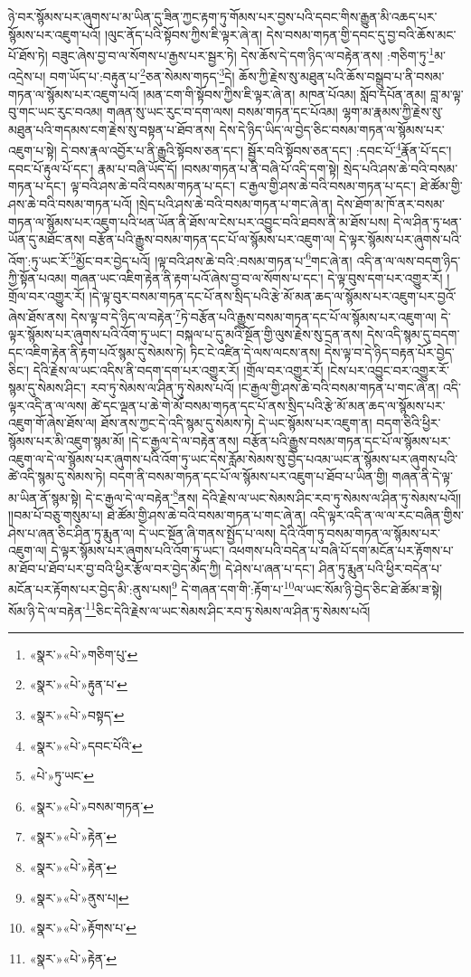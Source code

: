ཉེ་བར་སྙོམས་པར་ཞུགས་པ་མ་ཡིན་དུ་ཟིན་ཀྱང་རྟག་ཏུ་གོམས་པར་བྱས་པའི་དབང་གིས་རྒྱུན་མི་འཆད་པར་སྙོམས་པར་འཇུག་པའོ། །ལུང་ནོད་པའི་སྟོབས་ཀྱིས་ཇི་ལྟར་ཞེ་ན། དེས་བསམ་གཏན་གྱི་དབང་དུ་བྱ་བའི་ཆོས་མང་པོ་ཐོས་ཏེ། བཟུང་ཞེས་བྱ་བ་ལ་སོགས་པ་རྒྱས་པར་སྦྱར་ཏེ། དེས་ཆོས་དེ་དག་ཉིད་ལ་བརྟེན་ནས། :གཅིག་ཏུ་\footnote{«སྣར་»«པེ་»གཅིག་པུ་}མ་འདྲེས་པ། བག་ཡོད་པ་:བརྟུན་པ་\footnote{«སྣར་»«པེ་»རྟུན་པ་}ཅན་སེམས་གཏད་\footnote{«སྣར་»«པེ་»བསྟད་}དེ། ཆོས་ཀྱི་རྗེས་སུ་མཐུན་པའི་ཆོས་བསྒྲུབ་པ་ནི་བསམ་གཏན་ལ་སྙོམས་པར་འཇུག་པའོ། །མན་ངག་གི་སྟོབས་ཀྱིས་ཇི་ལྟར་ཞེ་ན། མཁན་པོའམ། སློབ་དཔོན་ནམ། བླ་མ་ལྟ་བུ་གང་ཡང་རུང་བའམ། གཞན་སུ་ཡང་རུང་བ་དག་ལས། བསམ་གཏན་དང་པོའམ། ལྷག་མ་རྣམས་ཀྱི་རྗེས་སུ་མཐུན་པའི་གདམས་ངག་རྗེས་སུ་བསྟན་པ་ཐོབ་ནས། དེས་དེ་ཉིད་ཡིད་ལ་བྱེད་ཅིང་བསམ་གཏན་ལ་སྙོམས་པར་འཇུག་པ་སྟེ། དེ་བས་རྣལ་འབྱོར་པ་ནི་རྒྱུའི་སྟོབས་ཅན་དང་། སྦྱོར་བའི་སྟོབས་ཅན་དང་། :དབང་པོ་\footnote{«སྣར་»«པེ་»དབང་པོའི་}རྣོན་པོ་དང་། དབང་པོ་རྟུལ་པོ་དང་། རྣམ་པ་བཞི་ཡོད་དོ། །བསམ་གཏན་པ་ནི་བཞི་པོ་འདི་དག་སྟེ། སྲེད་པའི་ཤས་ཆེ་བའི་བསམ་གཏན་པ་དང་། ལྟ་བའི་ཤས་ཆེ་བའི་བསམ་གཏན་པ་དང་། ང་རྒྱལ་གྱི་ཤས་ཆེ་བའི་བསམ་གཏན་པ་དང་། ཐེ་ཚོམ་གྱི་ཤས་ཆེ་བའི་བསམ་གཏན་པའོ། །སྲེད་པའི་ཤས་ཆེ་བའི་བསམ་གཏན་པ་གང་ཞེ་ན། དེས་ཐོག་མ་ཁོ་ནར་བསམ་གཏན་ལ་སྙོམས་པར་འཇུག་པའི་ཕན་ཡོན་ནི་ཐོས་ལ་ངེས་པར་འབྱུང་བའི་ཐབས་ནི་མ་ཐོས་པས། དེ་ལ་ཤིན་ཏུ་ཕན་ཡོན་དུ་མཐོང་ནས། བརྩོན་པའི་རྒྱུས་བསམ་གཏན་དང་པོ་ལ་སྙོམས་པར་འཇུག་ལ། དེ་ལྟར་སྙོམས་པར་ཞུགས་པའི་འོག་:ཏུ་ཡང་རོ་\footnote{«པེ་»ཏུ་ཡང་}མྱོང་བར་བྱེད་པའོ། །ལྟ་བའི་ཤས་ཆེ་བའི་:བསམ་གཏན་པ་\footnote{«སྣར་»«པེ་»བསམ་གཏན་}གང་ཞེ་ན། འདི་ན་ལ་ལས་བདག་ཉིད་ཀྱི་སྟོན་པའམ། གཞན་ཡང་འཇིག་རྟེན་ནི་རྟག་པའོ་ཞེས་བྱ་བ་ལ་སོགས་པ་དང་། དེ་ལྟ་བུས་དག་པར་འགྱུར་རོ། །གྲོལ་བར་འགྱུར་རོ། །དེ་ལྟ་བུར་བསམ་གཏན་དང་པོ་ནས་སྲིད་པའི་རྩེ་མོ་མན་ཆད་ལ་སྙོམས་པར་འཇུག་པར་བྱའོ་ཞེས་ཐོས་ནས། དེས་ལྟ་བ་དེ་ཉིད་ལ་བརྟེན་\footnote{«སྣར་»«པེ་»རྟེན་}ཏེ་བརྩོན་པའི་རྒྱུས་བསམ་གཏན་དང་པོ་ལ་སྙོམས་པར་འཇུག་ལ། དེ་ལྟར་སྙོམས་པར་ཞུགས་པའི་འོག་ཏུ་ཡང་། བསྐལ་པ་དུ་མའི་སྔོན་གྱི་ལུས་རྗེས་སུ་དྲན་ནས། དེས་འདི་སྙམ་དུ་བདག་དང་འཇིག་རྟེན་ནི་རྟག་པའོ་སྙམ་དུ་སེམས་ཏེ། ཏིང་ངེ་འཛིན་དེ་ལས་ལངས་ནས། དེས་ལྟ་བ་དེ་ཉིད་བརྟན་པོར་བྱེད་ཅིང་། དེའི་རྗེས་ལ་ཡང་འདིས་ནི་བདག་དག་པར་འགྱུར་རོ། །གྲོལ་བར་འགྱུར་རོ། །ངེས་པར་འབྱུང་བར་འགྱུར་རོ་སྙམ་དུ་སེམས་ཤིང་། རབ་ཏུ་སེམས་ལ་ཤིན་ཏུ་སེམས་པའོ། །ང་རྒྱལ་གྱི་ཤས་ཆེ་བའི་བསམ་གཏན་པ་གང་ཞེ་ན། འདི་ལྟར་འདི་ན་ལ་ལས། ཚེ་དང་ལྡན་པ་ཆེ་གེ་མོ་བསམ་གཏན་དང་པོ་ནས་སྲིད་པའི་རྩེ་མོ་མན་ཆད་ལ་སྙོམས་པར་འཇུག་གོ་ཞེས་ཐོས་ལ། ཐོས་ནས་ཀྱང་དེ་འདི་སྙམ་དུ་སེམས་ཏེ། དེ་ཡང་སྙོམས་པར་འཇུག་ན། བདག་ཅིའི་ཕྱིར་སྙོམས་པར་མི་འཇུག་སྙམ་མོ། །དེ་ང་རྒྱལ་དེ་ལ་བརྟེན་ནས། བརྩོན་པའི་རྒྱུས་བསམ་གཏན་དང་པོ་ལ་སྙོམས་པར་འཇུག་ལ་དེ་ལ་སྙོམས་པར་ཞུགས་པའི་འོག་ཏུ་ཡང་དེས་རློམ་སེམས་སུ་བྱེད་པའམ་ཡང་ན་སྙོམས་པར་ཞུགས་པའི་ཚེ་འདི་སྙམ་དུ་སེམས་ཏེ། བདག་ནི་བསམ་གཏན་དང་པོ་ལ་སྙོམས་པར་འཇུག་པ་ཐོབ་པ་ཡིན་གྱི། གཞན་ནི་དེ་ལྟ་མ་ཡིན་ནོ་སྙམ་སྟེ། དེ་ང་རྒྱལ་དེ་ལ་བརྟེན་\footnote{«སྣར་»«པེ་»རྟེན་}ནས། དེའི་རྗེས་ལ་ཡང་སེམས་ཤིང་རབ་ཏུ་སེམས་ལ་ཤིན་ཏུ་སེམས་པའོ།། །།བམ་པོ་བཅུ་གསུམ་པ། ཐེ་ཚོམ་གྱི་ཤས་ཆེ་བའི་བསམ་གཏན་པ་གང་ཞེ་ན། འདི་ལྟར་འདི་ན་ལ་ལ་རང་བཞིན་གྱིས་ཤེས་པ་ཞན་ཅིང་ཤིན་ཏུ་རྨུན་ལ། དེ་ཡང་སྔོན་ཞི་གནས་སྤྱོད་པ་ལས། དེའི་འོག་ཏུ་བསམ་གཏན་ལ་སྙོམས་པར་འཇུག་ལ། དེ་ལྟར་སྙོམས་པར་ཞུགས་པའི་འོག་ཏུ་ཡང་། འཕགས་པའི་བདེན་པ་བཞི་པོ་དག་མངོན་པར་རྟོགས་པ་མ་ཐོབ་པ་ཐོབ་པར་བྱ་བའི་ཕྱིར་རྩོལ་བར་བྱེད་མོད་ཀྱི། དེ་ཤེས་པ་ཞན་པ་དང་། ཤིན་ཏུ་རྨུན་པའི་ཕྱིར་བདེན་པ་མངོན་པར་རྟོགས་པར་བྱེད་མི་:ནུས་པས།\footnote{«སྣར་»«པེ་»ནུས་པ།} དེ་གཞན་དག་གི་:རྟོག་པ་\footnote{«སྣར་»«པེ་»རྟོགས་པ་}ལ་ཡང་སོམ་ཉི་བྱེད་ཅིང་ཐེ་ཚོམ་ཟ་སྟེ། སོམ་ཉི་དེ་ལ་བརྟེན་\footnote{«སྣར་»«པེ་»རྟེན་}ཅིང་དེའི་རྗེས་ལ་ཡང་སེམས་ཤིང་རབ་ཏུ་སེམས་ལ་ཤིན་ཏུ་སེམས་པའོ། 
